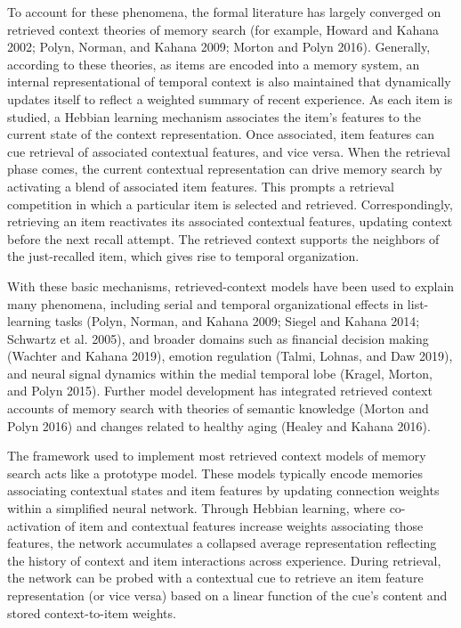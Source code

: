 \documentclass[
  letterpaper,
  DIV=11]{article}
\begin{document}
To account for these phenomena, the formal literature has largely
converged on retrieved context theories of memory search (for example,
Howard and Kahana 2002; Polyn, Norman, and Kahana 2009; Morton and Polyn
2016). Generally, according to these theories, as items are encoded into
a memory system, an internal representational of temporal context is
also maintained that dynamically updates itself to reflect a weighted
summary of recent experience. As each item is studied, a Hebbian
learning mechanism associates the item's features to the current state
of the context representation. Once associated, item features can cue
retrieval of associated contextual features, and vice versa. When the
retrieval phase comes, the current contextual representation can drive
memory search by activating a blend of associated item features. This
prompts a retrieval competition in which a particular item is selected
and retrieved. Correspondingly, retrieving an item reactivates its
associated contextual features, updating context before the next recall
attempt. The retrieved context supports the neighbors of the
just-recalled item, which gives rise to temporal organization.

With these basic mechanisms, retrieved-context models have been used to
explain many phenomena, including serial and temporal organizational
effects in list-learning tasks (Polyn, Norman, and Kahana 2009; Siegel
and Kahana 2014; Schwartz et al. 2005), and broader domains such as
financial decision making (Wachter and Kahana 2019), emotion regulation
(Talmi, Lohnas, and Daw 2019), and neural signal dynamics within the
medial temporal lobe (Kragel, Morton, and Polyn 2015). Further model
development has integrated retrieved context accounts of memory search
with theories of semantic knowledge (Morton and Polyn 2016) and changes
related to healthy aging (Healey and Kahana 2016).

The framework used to implement most retrieved context models of memory
search acts like a prototype model. These models typically encode
memories associating contextual states and item features by updating
connection weights within a simplified neural network. Through Hebbian
learning, where co-activation of item and contextual features increase
weights associating those features, the network accumulates a collapsed
average representation reflecting the history of context and item
interactions across experience. During retrieval, the network can be
probed with a contextual cue to retrieve an item feature representation
(or vice versa) based on a linear function of the cue's content and
stored context-to-item weights.
\end{document}
